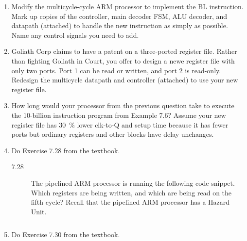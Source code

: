 \documentclass{ps}
\date{2019}
\author{}
\begin{document}
\begin{enumerate}
\item Modify the multicycle-cycle ARM processor to implement the BL
  instruction.  Mark up copies of the controller, main decoder FSM,
  ALU decoder, and datapath (attached) to handle the new instruction
  as simply as possible.  Name any control signals you need to add.

  \begin{solution}
  \end{solution}

\item Goliath Corp claims to have a patent on a three-ported register
  file.  Rather than fighting Goliath in Court, you offer to design a
  newe register file with only two ports.  Port 1 can be read or
  written, and port 2 is read-only.  Redesign the multicycle datapath
  and controller (attached) to use your new register file.

  \begin{solution}
  \end{solution}

\item How long would your processor from the previous question take to
  execute the 10-billion instruction program from Example 7.6?  Assume
  your new register file has \SI{30}{\percent} lower clk-to-Q and
  setup time because it has fewer ports but ordinary registers and
  other blocks have delay unchanges.

  \begin{solution}
  \end{solution}

\item Do Exercise 7.28 from the textbook.

  \begin{description}
  \item[7.28] The pipelined ARM processor is running the following
    code snippet.  Which registers are being written, and which are
    being read on the fifth cycle?  Recall that the pipelined ARM
    processor has a Hazard Unit.

    \inputminted{text}{code/ddca-7.28.arm}

    \begin{solution}
    \end{solution}
  \end{description}

\item Do Exercise 7.30 from the textbook.


\end{enumerate}
\end{document}
